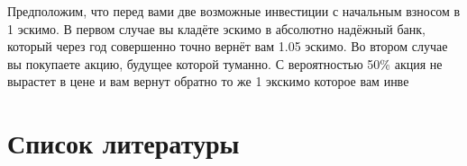 Предположим, что перед вами две возможные инвестиции с начальным взносом в 1 эскимо. В первом случае вы кладёте эскимо в абсолютно надёжный банк, который через год совершенно точно вернёт вам 1.05 эскимо. Во втором случае вы покупаете акцию, будущее которой туманно. С вероятностью 50\% акция не вырастет в цене и вам вернут обратно то же 1 экскимо которое вам инве

\section{Список литературы}
\en{
\printbibliography[heading = none]
}


